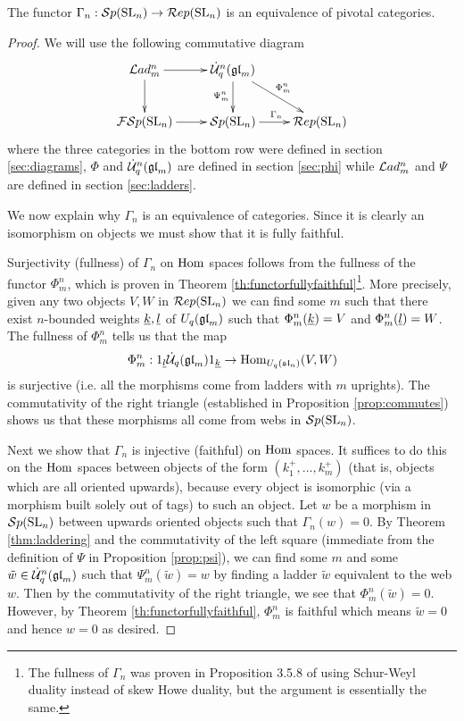 \documentclass[11pt]{amsart}
\begin{document}
\begin{thm}\label{thm:main}
The functor $\Gamma_n: {\mathcal{S}p}({\rm{SL}}_n) \rightarrow \mathcal{R}ep({\rm{SL}}_n)$ is an equivalence of pivotal categories.
\end{thm}
\begin{proof}
We will use the following commutative diagram
\begin{equation}\label{diag:main}
\xymatrix{
\Lad_m^n \ar[r] \ar[d] & \dU^n(\gl_m) \ar[dr]^{\Phi_m^n} \ar[d]_{\Psi_m^n} & \\
\FSp(\SL_n) \ar[r] & \Sp(\SL_n) \ar[r]^{\Gamma_n} & \Rep(\SL_n) \\
}
\end{equation}
where the three categories in the bottom row were defined in section \ref{sec:diagrams}, $\Phi$ and $\dot{{\mathcal{U}}}_q^n({\mathfrak{gl}}_m)$ are defined in section \ref{sec:phi} while $\mathcal{L}ad_m^n$ and $\Psi$ are defined in section \ref{sec:ladders}.

We now explain why $\Gamma_n$ is an equivalence of categories. Since it is clearly an isomorphism on objects we must show that it is fully faithful.

Surjectivity (fullness) of $\Gamma_n$ on $\operatorname{Hom}$ spaces follows from the fullness of the functor $ \Phi^n_m $, which is proven in Theorem \ref{th:functorfullyfaithful}\footnote{The fullness of $\Gamma_n$ was proven in Proposition 3.5.8 of \cite{0704.1503} using Schur-Weyl duality instead of skew Howe duality, but the argument is essentially the same.}.  More precisely, given any two objects $ V, W $ in $\mathcal{R}ep({\rm{SL}}_n) $ we can find some $m$ such that there exist $ n$-bounded weights $ {\underline{k}}, {\underline{l}} $ of $ U_q({\mathfrak{gl}}_m)$ such that $\Phi^n_m({\underline{k}}) = V$ and $\Phi^n_m({\underline{l}}) = W $. The fullness of $ \Phi^n_m $ tells us that the map
$$ \Phi^n_m : 1_{{\underline{l}}} \dot{{\mathcal{U}}}_q({\mathfrak{gl}}_m) 1_{{\underline{k}}} \rightarrow \operatorname{Hom}_{U_q({\mathfrak{sl}}_n)}(V, W) $$
is surjective (i.e. all the morphisms come from ladders with $m$ uprights). The commutativity of the right triangle (established in Proposition \ref{prop:commutes}) shows us that these morphisms all come from webs in $ {\mathcal{S}p}({\rm{SL}}_n) $.

Next we show that $ \Gamma_n $ is injective (faithful) on $ \operatorname{Hom}$ spaces. It suffices to do this on the $\operatorname{Hom}$ spaces between objects of the form $(k_1^+,\ldots,k_m^+)$ (that is, objects which are all oriented upwards), because every object is isomorphic (via a morphism built solely out of tags) to such an object.
Let $w$ be a morphism in $ {\mathcal{S}p}({\rm{SL}}_n)$ between upwards oriented objects such that $\Gamma_n(w)=0$.  By Theorem \ref{thm:laddering} and the commutativity of the left square (immediate from the definition of $\Psi$ in Proposition \ref{prop:psi}), we can find some $ m $ and some $\tilde{w} \in \dot{{\mathcal{U}}}_q^n({\mathfrak{gl}}_m) $ such that $ \Psi^n_m(\tilde{w}) = w $ by finding a ladder $ \tilde{w} $ equivalent to the web $ w $. Then by the commutativity of the right triangle, we see that $ \Phi^n_m(\tilde{w}) = 0 $.  However, by Theorem \ref{th:functorfullyfaithful}, $\Phi_m^n$ is faithful which means $\tilde{w}=0$ and hence $w=0$ as desired.
\end{proof}
\end{document}
